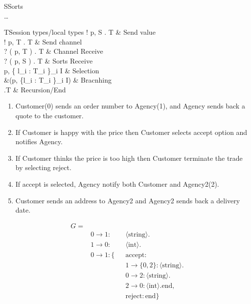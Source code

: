 \begin{table}[ht]
\begin{grammar}{S\Coloneqq}{Sorts}
   \mid {} \mid {} \\
  \dots\\
\end{grammar}
\hfill
\begin{grammar}{T\Coloneqq}{Session types/local types}
  ! \langle p, S \rangle . T & Send value\\
  ! \langle p, T \rangle . T & Send channel\\
  ? ( p, T ) . T & Channel Receive\\
  ? ( p, S ) . T & Sorts Receive\\
  \oplus \langle p, \{ l_i : T_i \}_{i \in I} \rangle & Selection \\
  \&(p, \{l_i : T_i \}_{i \in I}) & Bracnhing \\
  \mu {}.T  \mid {} \mid {} & Recursion/End
\end{grammar}
\caption{Session types/local types} \label{b:mpst:lt}
\end{table}
\begin{table}[ht]
  \begin{minipage}{0.45\textwidth}
    \begin{enumerate}
      \item Customer(0) sends an order number to Agency(1), and Agency sends back a quote to the customer.
      \item If Customer is happy with the price then Customer selects accept option and notifies Agency.
      \item If Customer thinks the price is too high then Customer terminate the trade by selecting reject.
      \item If accept is selected, Agency notify both Customer and Agency2(2). 
      \item Customer sends an address to Agency2 and Agency2 sends back a delivery date.
    \end{enumerate}
  \end{minipage}
  \hfill
  \begin{minipage}{0.45\textwidth}
    \begin{align*}
      G = \\
      & 0 \rightarrow 1: && \langle \text{string} \rangle .\\
      & 1 \rightarrow 0: && \langle \text{int} \rangle .\\
      & 0 \rightarrow 1: \{ && \text{accept}: \\
      & && 1 \rightarrow \{ 0, 2 \}: \langle \text{string} \rangle . \\
      & &&  0 \rightarrow 2: \langle \text{string} \rangle .\\
      & &&  2 \rightarrow 0: \langle \text{int} \rangle . \text{end}, \\
      & && \text{reject}: \text{end} \} \\
    \end{align*}
  \end{minipage}
  \caption{An example of a protocal described by global types G}
  \label{b:mpst:gtex}
\end{table}
